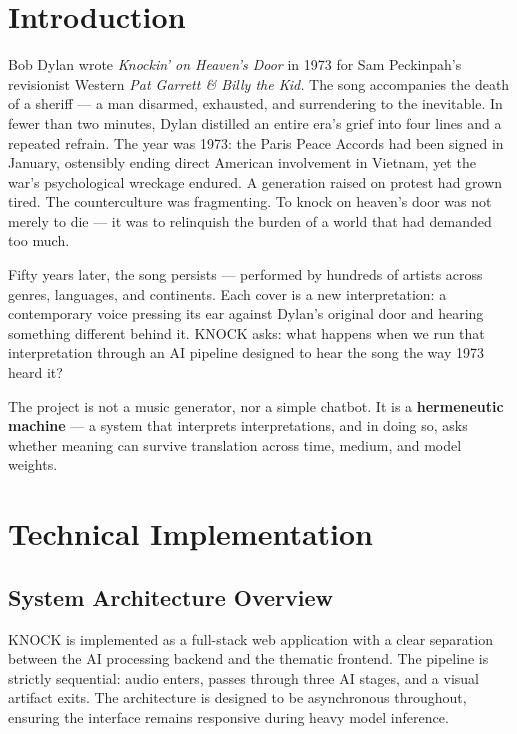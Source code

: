 \documentclass[12pt, a4paper]{article}
\begin{document}
\newpage

\tableofcontents
\newpage

\section{Introduction}

Bob Dylan wrote \textit{Knockin' on Heaven's Door} in 1973 for Sam Peckinpah's
revisionist Western \textit{Pat Garrett \& Billy the Kid.} The song accompanies
the death of a sheriff --- a man disarmed, exhausted, and surrendering to the
inevitable. In fewer than two minutes, Dylan distilled an entire era's grief into
four lines and a repeated refrain. The year was 1973: the Paris Peace Accords had
been signed in January, ostensibly ending direct American involvement in Vietnam,
yet the war's psychological wreckage endured. A generation raised on protest had
grown tired. The counterculture was fragmenting. To knock on heaven's door was not
merely to die --- it was to relinquish the burden of a world that had demanded too much.

Fifty years later, the song persists --- performed by hundreds of artists across
genres, languages, and continents. Each cover is a new interpretation: a contemporary
voice pressing its ear against Dylan's original door and hearing something different
behind it. KNOCK asks: what happens when we run that interpretation through an AI
pipeline designed to hear the song the way 1973 heard it?

The project is not a music generator, nor a simple chatbot. It is a
\textbf{hermeneutic machine} --- a system that interprets interpretations, and in
doing so, asks whether meaning can survive translation across time, medium,
and model weights.

\section{Technical Implementation}

\subsection{System Architecture Overview}

KNOCK is implemented as a full-stack web application with a clear separation between
the AI processing backend and the thematic frontend. The pipeline is strictly
sequential: audio enters, passes through three AI stages, and a visual artifact exits.
The architecture is designed to be asynchronous throughout, ensuring the interface
remains responsive during heavy model inference.
\end{document}
